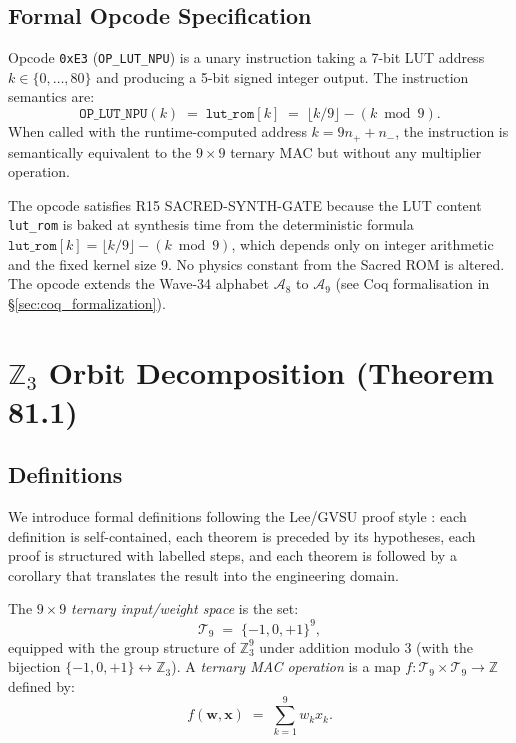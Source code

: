 \subsection{Formal Opcode Specification}

\begin{definition}
\label{def:op_lut_npu}
Opcode \texttt{0xE3} (\texttt{OP\_LUT\_NPU}) is a unary instruction taking
a 7-bit LUT address \(k \in \{0,\ldots,80\}\) and producing a 5-bit signed
integer output.  The instruction semantics are:
\[
  \texttt{OP\_LUT\_NPU}(k) \;=\; \texttt{lut\_rom}[k]
  \;=\; \lfloor k/9 \rfloor - (k \bmod 9).
\]
When called with the runtime-computed address $k = 9 n_{+} + n_{-}$, the
instruction is semantically equivalent to the $9 \times 9$ ternary MAC but
without any multiplier operation.
\end{definition}

The opcode satisfies R15 SACRED-SYNTH-GATE because the LUT content
\texttt{lut\_rom} is baked at synthesis time from the deterministic formula
$\texttt{lut\_rom}[k] = \lfloor k/9 \rfloor - (k \bmod 9)$, which depends only
on integer arithmetic and the fixed kernel size 9.  No physics constant from
the Sacred ROM is altered.  The opcode extends the Wave-34 alphabet
$\mathcal{A}_8$ to $\mathcal{A}_9$ (see Coq formalisation in
\S\ref{sec:coq_formalization}).

\section{$\mathbb{Z}_3$ Orbit Decomposition (Theorem 81.1)}
\label{sec:orbit_decomp}

\subsection{Definitions}

We introduce formal definitions following the Lee/GVSU proof style
\cite{lee_intro_topology}: each definition is self-contained, each theorem
is preceded by its hypotheses, each proof is structured with labelled steps,
and each theorem is followed by a corollary that translates the result into
the engineering domain.

\begin{definition}
\label{def:ternary_space}
The $9 \times 9$ \emph{ternary input/weight space} is the set:
\[
  \mathcal{T}_{9} \;=\; \{-1, 0, +1\}^9,
\]
equipped with the group structure of \(\mathbb{Z}_3^9\) under addition modulo 3
(with the bijection $\{-1,0,+1\} \leftrightarrow \mathbb{Z}_3$).
A \emph{ternary MAC operation} is a map
\(f : \mathcal{T}_{9} \times \mathcal{T}_{9} \to \mathbb{Z}\) defined by:
\[
  f(\mathbf{w}, \mathbf{x}) \;=\; \sum_{k=1}^{9} w_k x_k.
\]
\end{definition}

